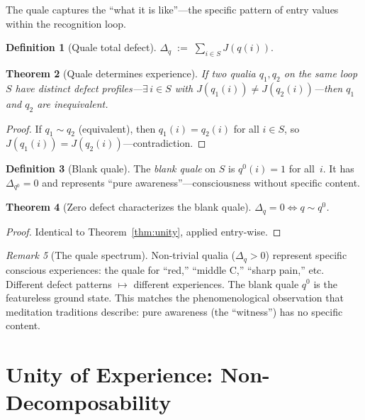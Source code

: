 \documentclass[11pt,a4paper]{article}
\theoremstyle{plain}
\newtheorem{theorem}{Theorem}[section]
\theoremstyle{definition}
\newtheorem{definition}[theorem]{Definition}
\theoremstyle{remark}
\newtheorem{remark}[theorem]{Remark}
\newcommand{\Jcost}{J}
\begin{document}
The quale captures the ``what it is like''---the specific pattern of
entry values within the recognition loop.

\begin{definition}[Quale total defect]
$\displaystyle
  \Delta_q \;:=\; \sum_{i \in S} \Jcost(q(i)).
$
\end{definition}

\begin{theorem}[Quale determines experience]
\label{thm:quale-det}
If two qualia $q_1, q_2$ on the same loop $S$ have distinct defect
profiles---$\exists\, i \in S$ with $\Jcost(q_1(i)) \neq
\Jcost(q_2(i))$---then $q_1$ and $q_2$ are inequivalent.
\end{theorem}

\begin{proof}
If $q_1 \sim q_2$ (equivalent), then $q_1(i) = q_2(i)$ for all
$i \in S$, so $\Jcost(q_1(i)) = \Jcost(q_2(i))$---contradiction.
\end{proof}

\begin{definition}[Blank quale]
The \emph{blank quale} on $S$ is $q^0(i) = 1$ for all~$i$.  It has
$\Delta_{q^0} = 0$ and represents ``pure awareness''---consciousness
without specific content.
\end{definition}

\begin{theorem}[Zero defect characterizes the blank quale]
\label{thm:blank}
$\Delta_q = 0 \iff q \sim q^0$.
\end{theorem}

\begin{proof}
Identical to Theorem~\ref{thm:unity}, applied entry-wise.
\end{proof}

\begin{remark}[The quale spectrum]
Non-trivial qualia ($\Delta_q > 0$) represent specific conscious
experiences: the quale for ``red,'' ``middle C,'' ``sharp pain,'' etc.
Different defect patterns $\mapsto$ different experiences.  The blank
quale $q^0$ is the featureless ground state.  This matches the
phenomenological observation that meditation traditions describe: pure
awareness (the ``witness'') has no specific content.
\end{remark}

\section{Unity of Experience: Non-Decomposability}
\label{sec:unity}
\end{document}
